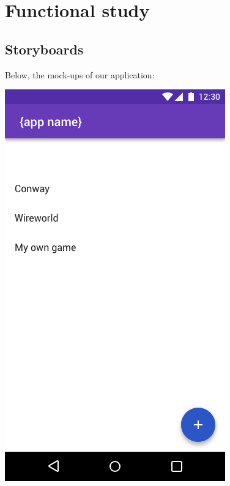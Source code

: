 \documentclass{report}
\begin{document}
\chapter{Functional study}

\section{Storyboards}

Below, the mock-ups of our application:
\vspace{12pt}

\begin{minipage}{.45\textwidth}
  \begin{minipage}{.45\linewidth}
    \includegraphics[width=\linewidth]{../mock-ups/Home.png}

\end{minipage}
\end{minipage}
\end{document}
